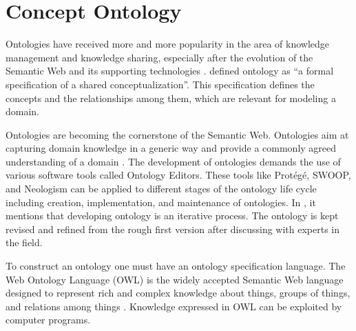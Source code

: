 \section{Concept Ontology}
Ontologies have received more and more popularity in the area of knowledge management and knowledge sharing, especially after the evolution of the Semantic Web and its supporting technologies \cite{Berners-Lee2001}. \citet{Gruber1993} defined ontology as \enquote{a formal specification of a shared conceptualization}. This specification defines the concepts and the relationships among them, which are relevant for modeling a domain. 

Ontologies are becoming the cornerstone of the Semantic Web. Ontologies aim at capturing domain knowledge in a generic way and provide a commonly agreed understanding of a domain \cite{Kapoor2010}. The development of ontologies demands the use of various software tools called Ontology Editors. These tools \cite{OntologyEditor} like Prot\'eg\'e, SWOOP, and Neologism can be applied to different stages of the ontology life cycle including creation, implementation, and maintenance of ontologies. In \cite{Kapoor2010}, it mentions that developing ontology is an iterative process. The ontology is kept revised and refined from the rough first version after discussing with experts in the field. 

To construct an ontology one must have an ontology specification language. The Web Ontology Language (OWL) is the widely accepted Semantic Web language designed to represent rich and complex knowledge about things, groups of things, and relations among things \cite{OWL2012}. Knowledge expressed in OWL can be exploited by computer programs.

